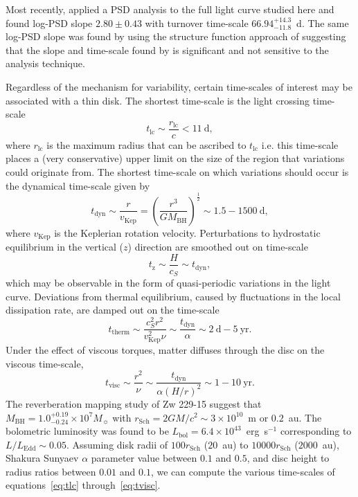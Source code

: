 \documentclass[a4paper,fleqn,usenatbib]{mnras}
\begin{document}
Most recently, \citet{CariniWilliamsAAS} applied a PSD analysis to the full light curve studied here and found log-PSD slope $2.80 \pm 0.43$ with turnover time-scale $66.94^{+14.3}_{-11.8}$~d. The same log-PSD slope was found by \citet{Kasliwal15b} using the structure function approach of \citet{Kasliwal15} suggesting that the slope and time-scale found by \citet{CariniWilliamsAAS} is significant and not sensitive to the analysis technique.

Regardless of the mechanism for variability, certain time-scales of interest may be associated with a thin disk. The shortest time-scale is the light crossing time-scale
\begin{equation}\label{eq:tlc}
t_{\mathrm{lc}} \sim \frac{r_{\mathrm{lc}}}{c} < 11~\text{d},
\end{equation}
where $r_{\mathrm{lc}}$ is the maximum radius that can be ascribed to $t_{\mathrm{lc}}$ \citep{Peterson} i.e. this time-scale places a (very conservative) upper limit on the size of the region that variations could originate from. The shortest time-scale on which variations should occur is the dynamical time-scale given by
\begin{equation}\label{eq:tdyn}
t_{\mathrm{dyn}} \sim \frac{r}{v_{\mathrm{Kep}}} = \left( \frac{r^{3}}{GM_{\mathrm{BH}}} \right)^{\frac{1}{2}} \sim 1.5 - 1500~\text{d},
\end{equation}
where $v_{\mathrm{Kep}}$ is the Keplerian rotation velocity. Perturbations to hydrostatic equilibrium in the vertical ($z$) direction are smoothed out on time-scale
\begin{equation}\label{eq:tz}
t_{\mathrm{z}} \sim \frac{H}{c_{S}} \sim t_{\mathrm{dyn}},
\end{equation}
which may be observable in the form of quasi-periodic variations in the light curve. Deviations from thermal equilibrium, caused by fluctuations in the local dissipation rate, are damped out on the time-scale
\begin{equation}\label{eq:ttherm}
t_{\mathrm{therm}} \sim \frac{c_{S}^{2}r^{2}}{v_{\mathrm{Kep}}^{2} \nu} \sim \frac{t_{\mathrm{dyn}}}{\alpha}  \sim 2~\text{d} - 5~\text{yr}.
\end{equation}
Under the effect of viscous torques, matter diffuses through the disc on the viscous time-scale,  
\begin{equation}\label{eq:tvisc}
t_{\mathrm{visc}} \sim \frac{r^{2}}{\nu} \sim \frac{t_{\mathrm{dyn}}}{\alpha (H/r)^{2}} \sim 1 - 10~\text{yr}.
\end{equation}
The \citet{Barth11} reverberation mapping study of Zw 229-15 suggest that $M_{\mathrm{BH}} = 1.0^{+0.19}_{-0.24} \times 10^{7} M_{\sun}$ with $r_{\mathrm{Sch}} = 2GM/c^{2} \sim 3 \times 10^{10}$~m or $0.2$~au. The bolometric luminosity was found to be $L_{\mathrm{bol}} = 6.4 \times 10^{43}$~erg~s$^{-1}$ corresponding to $L / L_{\mathrm{Edd}} \sim 0.05$. Assuming disk radii of $100 r_{\mathrm{Sch}}$ ($20$~au) to $10000 r_{\mathrm{{Sch}}}$ ($2000$~au), Shakura Sunyaev $\alpha$ parameter value between $0.1$ and $0.5$, and disc height to radius ratios between $0.01$ and $0.1$, we can compute the various time-scales of equations~\eqref{eq:tlc} through~\eqref{eq:tvisc}. 
\end{document}
